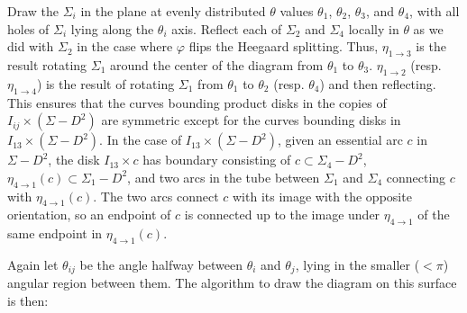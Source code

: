 \documentclass[12pt]{amsart}
\theoremstyle{definition}
\theoremstyle{remark}
\begin{document}
Draw the $\Sigma_i$ in the plane at evenly distributed $\theta$ values $\theta_1$, $\theta_2$, $\theta_3$, and $\theta_4$, with all holes of $\Sigma_i$ lying along the $\theta_i$ axis.
Reflect each of $\Sigma_2$ and $\Sigma_4$ locally in $\theta$ as we did with $\Sigma_2$ in the case where $\varphi$ flips the Heegaard splitting.
Thus, $\eta_{1 \to 3}$ is the result rotating $\Sigma_1$ around the center of the diagram from $\theta_1$ to $\theta_3$.
$\eta_{1 \to 2}$ (resp. $\eta_{1 \to 4}$) is the result of rotating $\Sigma_1$ from $\theta_1$ to $\theta_2$ (resp. $\theta_4$) and then reflecting.
This ensures that the curves bounding product disks in the copies of $I_{ij} \times (\Sigma - D^2)$ are symmetric except for the curves bounding disks in $I_{13} \times (\Sigma - D^2)$.
In the case of $I_{13} \times (\Sigma - D^2)$, given an essential arc $c$ in $\Sigma - D^2$, the disk $I_{13} \times c$ has boundary consisting of $c \subset \Sigma_4 - D^2$, $\eta_{4 \to 1}(c) \subset \Sigma_1 - D^2$, and two arcs in the tube between $\Sigma_1$ and $\Sigma_4$ connecting $c$ with $\eta_{4 \to 1}(c)$.
The two arcs connect $c$ with its image with the opposite orientation, so an endpoint of $c$ is connected up to the image under $\eta_{4 \to 1}$ of the same endpoint in $\eta_{4 \to 1}(c)$.

Again let $\theta_{ij}$ be the angle halfway between $\theta_i$ and $\theta_j$, lying in the smaller ($< \pi$) angular region between them.
The algorithm to draw the diagram on this surface is then:
\end{document}
